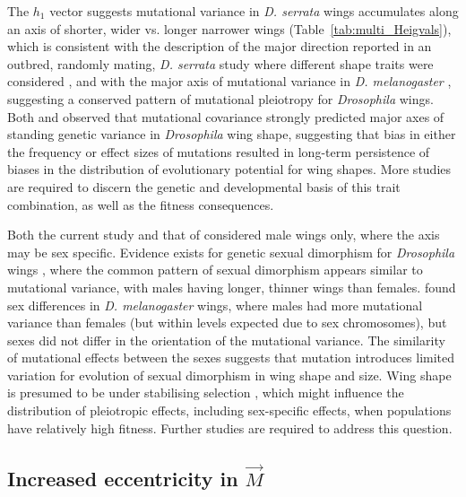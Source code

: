 The $h_1$ vector suggests mutational variance in \textit{D. serrata} wings accumulates along an axis of shorter, wider vs. longer narrower wings (Table~\ref{tab:multi_Heigvals}), which is consistent with the description of the major direction reported in an outbred, randomly mating, \textit{D. serrata} study where different shape traits were considered \citep{Duga21}, and with the major axis of mutational variance in \textit{D. melanogaster} \citep{Houl17}, suggesting a conserved pattern of mutational pleiotropy for \textit{Drosophila} wings. Both \citet{Duga21} and \citet{Houl17} observed that mutational covariance strongly predicted major axes of standing genetic variance in \textit{Drosophila} wing shape, suggesting that bias in either the frequency or effect sizes of mutations resulted in long-term persistence of biases in the distribution of evolutionary potential for wing shapes. More studies are required to discern the genetic and developmental basis of this trait combination, as well as the fitness consequences. \par

Both the current study and that of \citet{Duga21} considered male wings only, where the axis may be sex specific. Evidence exists for genetic sexual dimorphism for \textit{Drosophila} wings \citep{Szte19,Szte21}, where the common pattern of sexual dimorphism appears similar to mutational variance, with males having longer, thinner wings than females. \citet{Houl13} found sex differences in \textit{D. melanogaster} wings, where males had more mutational variance than females (but within levels expected due to sex chromosomes), but sexes did not differ in the orientation of the mutational variance. The similarity of mutational effects between the sexes suggests that mutation introduces limited variation for evolution of sexual dimorphism in wing shape and size. Wing shape is presumed to be under stabilising selection \citep{Houl17, Duga21}, which might influence the distribution of pleiotropic effects, including sex-specific effects, when populations have relatively high fitness. Further studies are required to address this question. \par

\subsection{Increased eccentricity in $\vec{M}$}


